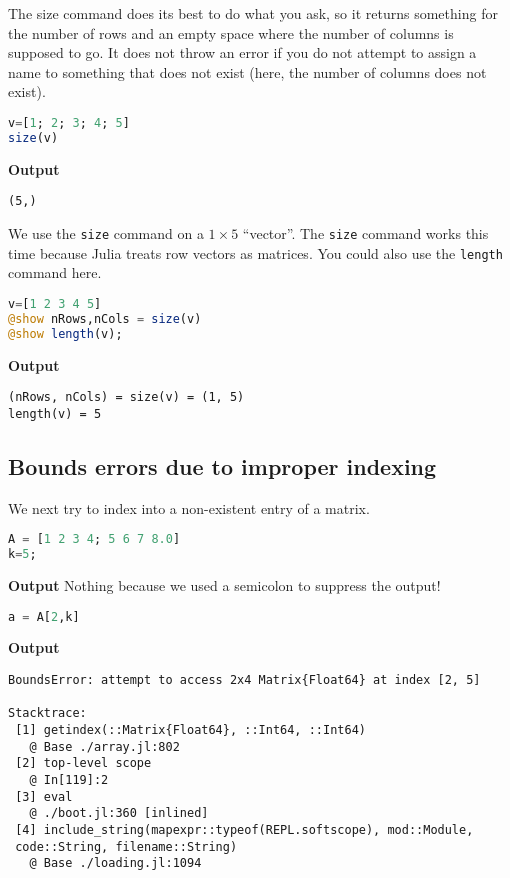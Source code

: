 The size command does its best to do what you ask, so it returns something for the number of rows and an empty space where the number of columns is supposed to go. It does not throw an error if you do not attempt to assign a name to something that does not exist (here, the number of columns does not exist).

\begin{lstlisting}[language=Julia,style=mystyle]
v=[1; 2; 3; 4; 5]
size(v)
\end{lstlisting}
\textbf{Output} 
\begin{verbatim}
(5,)
\end{verbatim}

We use the \texttt{size} command on a $ 1 \times 5$ ``vector''. The \texttt{size} command works this time because Julia treats row vectors as matrices. You could also use the \texttt{length} command here. 
\begin{lstlisting}[language=Julia,style=mystyle]
v=[1 2 3 4 5]
@show nRows,nCols = size(v)
@show length(v);
\end{lstlisting}
\textbf{Output} 
\begin{verbatim}
(nRows, nCols) = size(v) = (1, 5)
length(v) = 5
\end{verbatim}

\subsection{Bounds errors due to improper indexing}

We next try to index into a non-existent entry of a matrix.

\begin{lstlisting}[language=Julia,style=mystyle]
A = [1 2 3 4; 5 6 7 8.0]
k=5;
\end{lstlisting}
\textbf{Output} 
Nothing because we used a semicolon to suppress the output!

\begin{lstlisting}[language=Julia,style=mystyle]
a = A[2,k]
\end{lstlisting}
\textbf{Output} 
\begin{verbatim}
BoundsError: attempt to access 2x4 Matrix{Float64} at index [2, 5]

Stacktrace:
 [1] getindex(::Matrix{Float64}, ::Int64, ::Int64)
   @ Base ./array.jl:802
 [2] top-level scope
   @ In[119]:2
 [3] eval
   @ ./boot.jl:360 [inlined]
 [4] include_string(mapexpr::typeof(REPL.softscope), mod::Module, 
 code::String, filename::String)
   @ Base ./loading.jl:1094
\end{verbatim}

